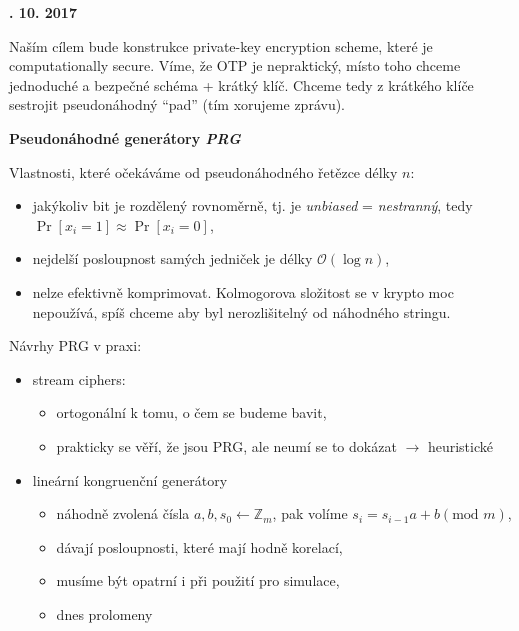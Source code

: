 \documentclass[a4paper,12pt,titlepage]{article}
\def\podnadpis#1{{\bigskip\bf\noindent#1\medskip\par}}
\begin{document}
\podnadpis{19. 10. 2017}

Naším cílem bude konstrukce private-key encryption scheme, které je computationally secure.
Víme, že OTP je nepraktický, místo toho chceme jednoduché a bezpečné schéma + krátký klíč.
Chceme tedy z krátkého klíče sestrojit pseudonáhodný ``pad'' (tím xorujeme zprávu).

\podnadpis{Pseudonáhodné generátory \emph{PRG}}

Vlastnosti, které očekáváme od pseudonáhodného řetězce délky $n$:
\begin{itemize}
	\item  jakýkoliv bit je rozdělený rovnoměrně, tj. je \emph{unbiased} = \emph{nestranný}, tedy $\Pr[x_i = 1] \approx \Pr[x_i = 0]$,
	\item  nejdelší posloupnost samých jedniček je délky $\mathcal{O}(\log n)$,
	\item  nelze efektivně komprimovat.
		Kolmogorova složitost se v krypto moc nepoužívá, spíš chceme aby byl nerozlišitelný od náhodného stringu.
\end{itemize}

Návrhy PRG v praxi:
\begin{itemize}
	\item  stream ciphers:
		\begin{itemize}
			\item  ortogonální k tomu, o čem se budeme bavit,
			\item  prakticky se věří, že jsou PRG, ale neumí se to dokázat $\rightarrow$ heuristické
		\end{itemize}

	\item  lineární kongruenční generátory
		\begin{itemize}
			\item  náhodně zvolená čísla $a, b, s_0 \leftarrow \mathbb{Z}_m$, pak volíme $s_i = s_{i - 1} a + b (\text{mod } m)$,
			\item  dávají posloupnosti, které mají hodně korelací,
			\item  musíme být opatrní i při použití pro simulace,
			\item  dnes prolomeny
		\end{itemize}
\end{itemize}
\end{document}
